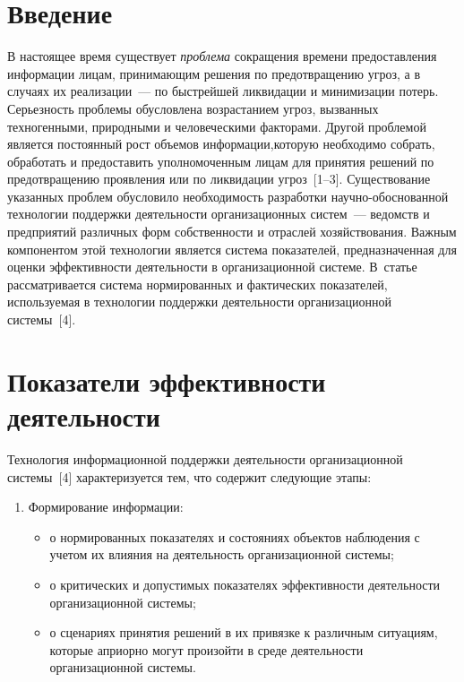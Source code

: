 \begin{multicols}{2}

\label{st\stat}


\section{Введение }

     В настоящее время существует \textit{проблема} сокращения времени
предоставления информации лицам, принимающим решения по предотвращению
угроз, а в случаях их реализации~--- по быстрейшей ликвидации и минимизации
потерь. Серьезность проблемы обусловлена возрастанием угроз, вызванных
техногенными, природными и человеческими факторами. Другой проблемой
является постоянный рост объемов информации,\linebreak \mbox{которую} необходимо собрать,
обработать и пред\-оста\-вить уполномоченным лицам для принятия решений по
предотвращению проявления или по ликвидации угроз~[1--3]. Существование
указанных проблем обусловило необходимость разработки научно-обоснованной
технологии поддержки деятельности организационных сис\-тем~--- ведомств и
предприятий различных форм собственности и отраслей хозяйствования. Важным
компонентом этой технологии является система показателей, предназначенная для
оценки эффективности деятельности в организационной системе. В~статье
рассматривается система нормированных и фактических показателей, используемая
в технологии поддержки деятельности организационной системы~[4].

\section{Показатели эффективности деятельности}

     Технология информационной поддержки деятельности организационной
системы~[4] характеризуется тем, что содержит следующие этапы:
     \begin{enumerate}[1.]
     \item Формирование информации:
     \begin{itemize}
  \item о нормированных показателях и состояниях объектов наблюдения с учетом
их влияния на деятельность организационной системы;
  \item о критических и допустимых показателях эффективности деятельности
организационной системы;
  \item о сценариях принятия решений в их привязке к различным ситуациям,
которые априорно могут произойти в среде деятельности организационной
системы.
  \end{itemize}
  \begin{table*}[b]\small
\begin{center}
      \vspace*{2ex}


\end{center}
\end{table*}
\end{enumerate}
\end{multicols}
